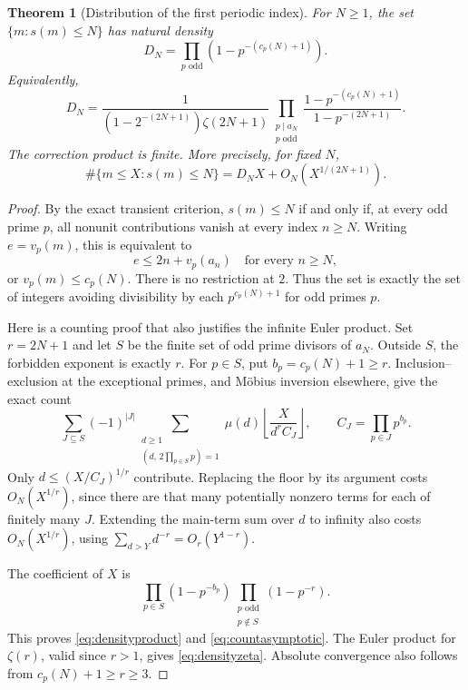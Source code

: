\documentclass[11pt,a4paper]{article}
\numberwithin{equation}{section}
\newtheorem{theorem}{Theorem}[section]
\theoremstyle{definition}
\begin{document}
\begin{theorem}[Distribution of the first periodic index]\label{thm:density}
For $N\ge1$, the set $\{m:s(m)\le N\}$ has natural density
\begin{equation}\label{eq:densityproduct}
D_N=\prod_{p\text{ odd}}\left(1-p^{-(c_p(N)+1)}\right).
\end{equation}
Equivalently,
\begin{equation}\label{eq:densityzeta}
D_N=\frac{1}{(1-2^{-(2N+1)})\zeta(2N+1)}
\prod_{\substack{p\mid a_N\\p\text{ odd}}}
\frac{1-p^{-(c_p(N)+1)}}{1-p^{-(2N+1)}}.
\end{equation}
The correction product is finite. More precisely, for fixed $N$,
\begin{equation}\label{eq:countasymptotic}
\#\{m\le X:s(m)\le N\}
=D_N X+O_N\!\left(X^{1/(2N+1)}\right).
\end{equation}
\end{theorem}

\begin{proof}
By the exact transient criterion, $s(m)\le N$ if and only if, at every
odd prime $p$, all nonunit contributions vanish at every index $n\ge N$.
Writing $e=v_p(m)$, this is equivalent to
\[
e\le2n+v_p(a_n)\quad\text{for every }n\ge N,
\]
or $v_p(m)\le c_p(N)$. There is no restriction at $2$.
Thus the set is exactly the set of integers avoiding divisibility by
each $p^{c_p(N)+1}$ for odd primes $p$.

Here is a counting proof that also justifies the infinite Euler product.
Set $r=2N+1$ and let $S$ be the finite set of odd prime divisors of $a_N$.
Outside $S$, the forbidden exponent is exactly $r$. For $p\in S$, put
$b_p=c_p(N)+1\ge r$. Inclusion--exclusion at the exceptional primes,
and M\"obius inversion elsewhere, give the exact count
\[
\sum_{J\subseteq S}(-1)^{|J|}
\sum_{\substack{d\ge1\\(d,\,2\prod_{p\in S}p)=1}}
\mu(d)\left\lfloor\frac{X}{d^r C_J}\right\rfloor,
\qquad C_J=\prod_{p\in J}p^{b_p}.
\]
Only $d\le(X/C_J)^{1/r}$ contribute. Replacing the floor by its
argument costs $O_N(X^{1/r})$, since there are that many potentially
nonzero terms for each of finitely many $J$. Extending the main-term
sum over $d$ to infinity also costs $O_N(X^{1/r})$, using
$\sum_{d>Y}d^{-r}=O_r(Y^{1-r})$.

The coefficient of $X$ is
\[
\prod_{p\in S}(1-p^{-b_p})
\prod_{\substack{p\text{ odd}\\p\notin S}}(1-p^{-r}).
\]
This proves \eqref{eq:densityproduct} and \eqref{eq:countasymptotic}.
The Euler product for $\zeta(r)$, valid since $r>1$, gives
\eqref{eq:densityzeta}. Absolute convergence also follows from
$c_p(N)+1\ge r\ge3$.
\end{proof}
\end{document}
